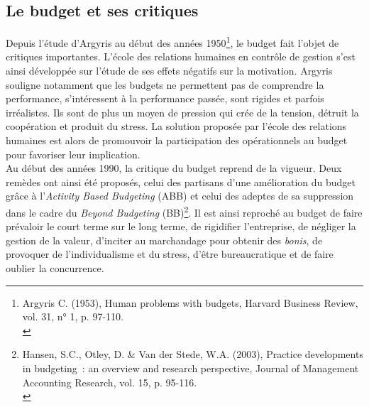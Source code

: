 \documentclass{tufte-handout}
\begin{document}
\subsection{Le budget et ses critiques}
\label{sec:org7a7ae17}
Depuis l'étude d'Argyris au début des années 1950\footnote{Argyris C. (1953), Human problems with budgets, Harvard Business Review, vol. 31, n° 1, p. 97-110.\\}, le budget fait l'objet de critiques importantes. L'école des relations humaines en contrôle de gestion s'est ainsi développée sur l'étude de ses effets négatifs sur la motivation. Argyris souligne notamment que les budgets ne permettent pas de comprendre la performance, s'intéressent à la performance passée, sont rigides et parfois irréalistes. Ils sont de plus un moyen de pression qui crée de la tension, détruit la coopération et produit du stress. La solution proposée par l'école des relations humaines est alors de promouvoir la participation des opérationnels au budget pour favoriser leur implication.\\

Au début des années 1990, la critique du budget reprend de la vigueur. Deux remèdes ont ainsi été proposés, celui des partisans d'une amélioration du budget grâce à l'\emph{Activity Based Budgeting} (ABB) et celui des adeptes de sa suppression dans le cadre du \emph{Beyond Budgeting} (BB)\footnote{Hansen, S.C., Otley, D. \& Van der Stede, W.A. (2003), Practice developments in budgeting : an overview and research perspective, Journal of Management Accounting Research, vol. 15, p. 95-116.\\}. Il est ainsi reproché au budget de faire prévaloir le court terme sur le long terme, de rigidifier l'entreprise, de négliger la gestion de la valeur, d'inciter au marchandage pour obtenir des \emph{bonis}, de provoquer de l'individualisme et du stress, d'être bureaucratique et de faire oublier la concurrence.\\
\end{document}
